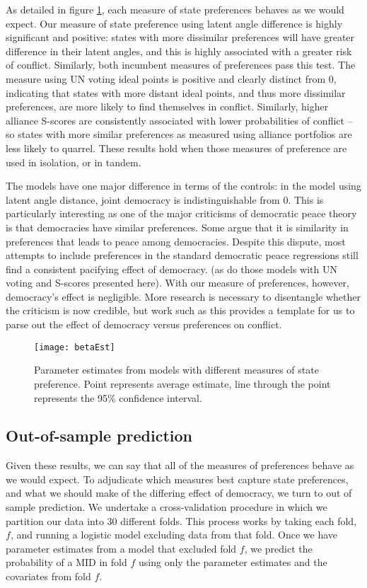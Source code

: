 As detailed in figure \ref{fig:coefP}, each measure of state preferences behaves as we would expect. Our measure of state preference using latent angle difference is highly significant and positive: states with more dissimilar preferences will have greater difference in their latent angles, and this is highly associated with a greater risk of conflict. Similarly, both incumbent measures of preferences pass this test. The measure using UN voting ideal points is positive and clearly distinct from $0$, indicating that states with more distant ideal points, and thus more dissimilar preferences, are more likely to find themselves in conflict. Similarly, higher alliance S-scores are consistently associated with lower probabilities of conflict -- so states with more similar preferences as measured using alliance portfolios are less likely to quarrel. These results hold when those measures of preference are used in isolation, or in tandem.

The models have one major difference in terms of the controls: in the model using latent angle distance, joint democracy is indistinguishable from $0$. This is particularly interesting as one of the major criticisms of democratic peace theory is that democracies have similar preferences. Some argue that it is similarity in preferences that leads to peace among democracies.  Despite this dispute, most attempts to include preferences in the standard democratic peace regressions still find a consistent pacifying effect of democracy.
(as do those models with UN voting and S-scores presented here). With our measure of preferences, however, democracy's effect is negligible. More research is necessary to disentangle whether the criticism is now credible, but work such as this provides a template for us to parse out the effect of democracy versus preferences on conflict.


\begin{figure}[ht]
	\centering
	\texttt{[image: betaEst]}
	\caption{Parameter estimates from models with different measures of state preference. Point represents average estimate, line through the point represents the 95\% confidence interval.}
	\label{fig:coefP}
\end{figure}
\FloatBarrier

\subsection*{Out-of-sample prediction}

Given these results, we can say that all of the measures of preferences behave as we would expect. To adjudicate which measures best capture state preferences, and what we should make of the differing effect of democracy, we turn to out of sample prediction. We undertake a cross-validation procedure in which we partition our data into 30 different folds. This process works by taking each fold, $f$, and running a logistic model excluding data from that fold. Once we have parameter estimates from a model that excluded fold $f$, we predict the probability of a MID in fold $f$ using only the parameter estimates and the covariates from fold $f$.

